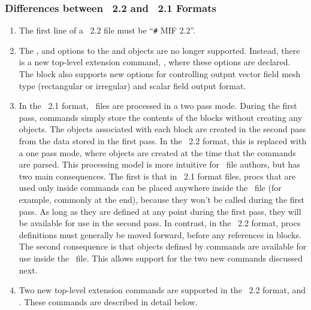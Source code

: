 \subsubsection{Differences between \MIF~2.2 and \MIF~2.1 Formats}\label{sec:mif22diffs}
\begin{enumerate}
\item The first line of a \MIF~2.2 file must be ``\verb+#+ MIF 2.2''.
\item The ,  and
  options to the 
 and  objects are no longer supported.  Instead,
 there is a new top-level extension command, , where
 these options are declared.  The  block also
 supports new options for controlling output vector field mesh type
 (rectangular or irregular) and scalar field output format.
\item In the \MIF~2.1 format, \MIF\ files are
 processed in a two pass mode.  During the first pass, 
 commands simply store the contents of the  blocks without
 creating any  objects.  The  objects
 associated with each  block are created in the second pass
 from the data stored in the first pass.  In the \MIF~2.2 format, this is
 replaced with a one pass mode, where  objects are created
 at the time that the  commands are parsed.  This processing
 model is more intuitive for \MIF\ file authors, but has two main
 consequences.  The first is that in \MIF~2.1 format files, \Tcl procs that
 are used only inside  commands can be placed anywhere inside
 the \MIF\ file (for example, commonly at the end), because they won't be
 called during the first pass.  As long as they are defined at any point
 during the first pass, they will be available for use in the second
 pass.  In contrast, in the \MIF~2.2 format, \Tcl procs definitions must
 generally be moved forward, before any references in 
 blocks.  The second consequence is that  objects defined by
  commands are available for use inside the \MIF\ file.  This
 allows support for the two new commands discussed next.
\item Two new top-level extension commands are supported in the \MIF~2.2
 format,  and .  These commands
 are described in detail below.
\end{enumerate}

